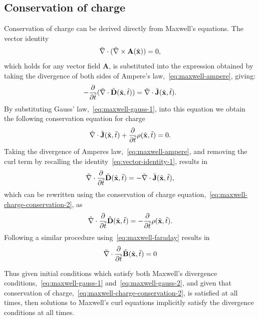 \subsection{Conservation of charge}
Conservation of charge can be derived directly from Maxwell's equations. The
vector identity
\begin{equation}
  \label{eq:vector-identity-1}
  \tilde{\nabla} \cdot ( \tilde{\nabla} \times \mathbf{A} (\tilde{\mathbf{x}}) ) = 0,
\end{equation}
which holds for any vector field $\mathbf{A}$, is substituted into the
expression obtained by taking the divergence of both sides of Ampere's
law,~\eqref{eq:maxwell-ampere}, giving:
$$
- \frac{\partial}{\partial \tilde{t} } ( \tilde{\nabla} \cdot \tilde{\mathbf{D}}(\tilde{\mathbf{x}},\tilde{t}) ) = \tilde{\nabla}
\cdot \tilde{\mathbf{J}}(\tilde{\mathbf{x}},\tilde{t}) .
$$
By substituting Gauss' law,~\eqref{eq:maxwell-gauss-1}, into this equation we
obtain the following conservation equation for charge
\begin{equation}
  \label{eq:maxwell-charge-conservation-2}
  \tilde{\nabla} \cdot \tilde{\mathbf{J}}(\tilde{\mathbf{x}},\tilde{t}) + \frac{\partial}{\partial \tilde{t} } \rho (\tilde{\mathbf{x}},\tilde{t}) = 0 .
\end{equation}
Taking the divergence of Amperes law,~\eqref{eq:maxwell-ampere}, and removing
the curl term by recalling the identity~\eqref{eq:vector-identity-1}, results in
$$
\tilde{\nabla} \cdot \frac{\partial}{\partial \tilde{t} }  \tilde{\mathbf{D}}(\tilde{\mathbf{x}}, \tilde{t}) = - \tilde{\nabla}
\cdot \tilde{\mathbf{J}}(\tilde{\mathbf{x}},\tilde{t}),
$$
which can be rewritten using the conservation of charge
equation,~\eqref{eq:maxwell-charge-conservation-2}, as
$$
\tilde{\nabla} \cdot \frac{\partial}{\partial \tilde{t} } \tilde{\mathbf{D}}(\tilde{\mathbf{x}}, \tilde{t}) = - \frac{\partial}{\partial \tilde{t} } 
  \rho (\tilde{\mathbf{x}},\tilde{t}).
$$
Following a similar procedure using~\eqref{eq:maxwell-faraday} results in
$$
\tilde{\nabla} \cdot \frac{\partial}{\partial \tilde{t} }  \tilde{\mathbf{B}}(\tilde{\mathbf{x}}, \tilde{t}) = 0
$$

Thus given initial conditions which satisfy both Maxwell's divergence
conditions,~\eqref{eq:maxwell-gauss-1} and~\eqref{eq:maxwell-gauss-2}, and given
that conservation of charge,~\eqref{eq:maxwell-charge-conservation-2}, is
satisfied at all times, then solutions to Maxwell's curl equations 
implicitly satisfy the divergence conditions at all times.

